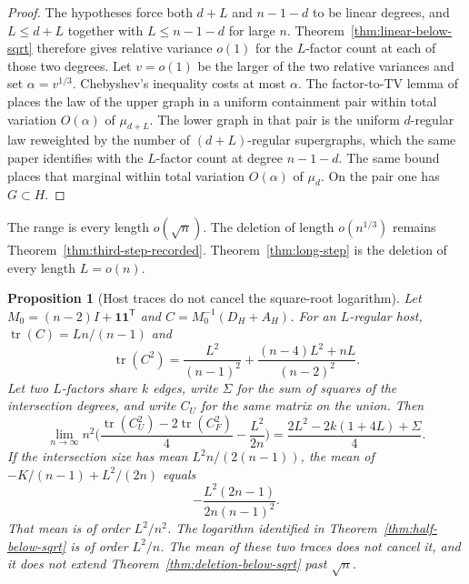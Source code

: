 \documentclass[11pt]{article}
\newtheorem{proposition}[theorem]{Proposition}
\begin{document}
\begin{proof}
The hypotheses force both \(d+L\) and \(n-1-d\) to be linear degrees, and
\(L\le d+L\) together with \(L\le n-1-d\) for large \(n\).
Theorem~\ref{thm:linear-below-sqrt} therefore gives relative variance \(o(1)\)
for the \(L\)-factor count at each of those two degrees.
Let \(v=o(1)\) be the larger of the two relative variances and set
\(\alpha=v^{1/3}\). Chebyshev's inequality costs at most \(\alpha\).
The factor-to-TV lemma of~\cite{PlusOneV1} places the law of the upper graph
in a uniform containment pair within total variation \(O(\alpha)\) of
\(\mu_{d+L}\).
The lower graph in that pair is the uniform \(d\)-regular law reweighted by the
number of \((d+L)\)-regular supergraphs, which the same paper identifies with
the \(L\)-factor count at degree \(n-1-d\).
The same bound places that marginal within total variation \(O(\alpha)\) of
\(\mu_d\). On the pair one has \(G\subset H\).
\end{proof}

The range is every length \(o(\sqrt{n})\).
The deletion of length \(o(n^{1/3})\) remains
Theorem~\ref{thm:third-step-recorded}.
Theorem~\ref{thm:long-step} is the deletion of every length \(L=o(n)\).

\begin{proposition}[Host traces do not cancel the square-root logarithm]
\label{prop:host-trace}
Let \(M_0=(n-2)I+\mathbf{1}\mathbf{1}^{\mathsf T}\) and
\(C=M_0^{-1}(D_H+A_H)\).
For an \(L\)-regular host, \(\operatorname{tr}(C)=Ln/(n-1)\) and
\[
\operatorname{tr}(C^2)
=
\frac{L^2}{(n-1)^2}+\frac{(n-4)L^2+nL}{(n-2)^2}.
\]
Let two \(L\)-factors share \(k\) edges, write \(\Sigma\) for the sum of squares of
the intersection degrees, and write \(C_U\) for the same matrix on the union.
Then
\[
\lim_{n\to\infty}
n^2\Biggl(
\frac{\operatorname{tr}(C_U^2)-2\operatorname{tr}(C_F^2)}{4}
-\frac{L^2}{2n}
\Biggr)
=
\frac{2L^2-2k(1+4L)+\Sigma}{4}.
\]
If the intersection size has mean \(L^2 n/(2(n-1))\), the mean of
\(-K/(n-1)+L^2/(2n)\) equals
\[
-\frac{L^2(2n-1)}{2n(n-1)^2}.
\]
That mean is of order \(L^2/n^2\). The logarithm identified in
Theorem~\ref{thm:half-below-sqrt} is of order \(L^2/n\).
The mean of these two traces does not cancel it, and it does not extend
Theorem~\ref{thm:deletion-below-sqrt} past \(\sqrt{n}\).
\end{proposition}
\end{document}
